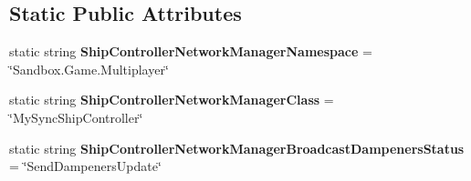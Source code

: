 \subsection*{Static Public Attributes}
\begin{DoxyCompactItemize}
\item 
\hypertarget{class_s_e_mod_a_p_i_internal_1_1_a_p_i_1_1_entity_1_1_sector_1_1_sector_object_1_1_cube_grid_1_10d30164bdccb131dcc67927f77b8ef67_ab8bffea2e6f28008a9d8aa23d78edce7}{}static string {\bfseries Ship\+Controller\+Network\+Manager\+Namespace} = \char`\"{}Sandbox.\+Game.\+Multiplayer\char`\"{}\label{class_s_e_mod_a_p_i_internal_1_1_a_p_i_1_1_entity_1_1_sector_1_1_sector_object_1_1_cube_grid_1_10d30164bdccb131dcc67927f77b8ef67_ab8bffea2e6f28008a9d8aa23d78edce7}

\item 
\hypertarget{class_s_e_mod_a_p_i_internal_1_1_a_p_i_1_1_entity_1_1_sector_1_1_sector_object_1_1_cube_grid_1_10d30164bdccb131dcc67927f77b8ef67_af07f99153f6a788fa1f1562a8bfc14a7}{}static string {\bfseries Ship\+Controller\+Network\+Manager\+Class} = \char`\"{}My\+Sync\+Ship\+Controller\char`\"{}\label{class_s_e_mod_a_p_i_internal_1_1_a_p_i_1_1_entity_1_1_sector_1_1_sector_object_1_1_cube_grid_1_10d30164bdccb131dcc67927f77b8ef67_af07f99153f6a788fa1f1562a8bfc14a7}

\item 
\hypertarget{class_s_e_mod_a_p_i_internal_1_1_a_p_i_1_1_entity_1_1_sector_1_1_sector_object_1_1_cube_grid_1_10d30164bdccb131dcc67927f77b8ef67_a49ea3d5f85f69f7a837f5df830c901a7}{}static string {\bfseries Ship\+Controller\+Network\+Manager\+Broadcast\+Dampeners\+Status} = \char`\"{}Send\+Dampeners\+Update\char`\"{}\label{class_s_e_mod_a_p_i_internal_1_1_a_p_i_1_1_entity_1_1_sector_1_1_sector_object_1_1_cube_grid_1_10d30164bdccb131dcc67927f77b8ef67_a49ea3d5f85f69f7a837f5df830c901a7}

\end{DoxyCompactItemize}
